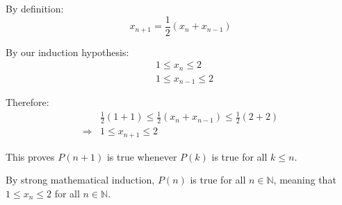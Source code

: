 \documentclass{article}
\begin{document}
By definition:
$$x_{n+1} = \frac{1}{2}(x_n + x_{n-1})$$

By our induction hypothesis:
\begin{align*}
   & 1 \leq x_n \leq 2 \\
   & 1 \leq x_{n-1} \leq 2
\end{align*}

Therefore:
\begin{align*}
   & \frac{1}{2}(1 + 1) \leq \frac{1}{2}(x_n + x_{n-1}) \leq \frac{1}{2}(2 + 2) \\
   \Rightarrow & 1 \leq x_{n+1} \leq 2
\end{align*}

This proves $P(n+1)$ is true whenever $P(k)$ is true for all $k \leq n$.

By strong mathematical induction, $P(n)$ is true for all $n \in \mathbb{N}$, meaning that $1 \leq x_n \leq 2$ for all $n \in \mathbb{N}$.
\end{document}
